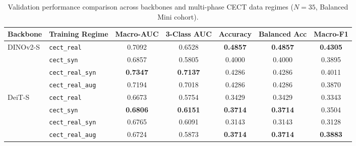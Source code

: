 \begin{table}[t]
\centering
\caption{Validation performance comparison across backbones and multi-phase CECT data regimes ($N=35$, Balanced Mini cohort).}
\label{tab:validation_cect_results_mini}
\begin{tabular}{llccccc}
\toprule
\textbf{Backbone} & \textbf{Training Regime} & \textbf{Macro-AUC} & \textbf{3-Class AUC} & \textbf{Accuracy} & \textbf{Balanced Acc} & \textbf{Macro-F1} \\
\midrule
\multirow{4}{*}{DINOv2-S} & \texttt{cect\_real}       & 0.7092 & 0.6528 & \textbf{0.4857} & \textbf{0.4857} & \textbf{0.4305} \\
                          & \texttt{cect\_syn}        & 0.6857 & 0.5805 & 0.4000 & 0.4000 & 0.3895 \\
                          & \texttt{cect\_real\_syn}  & \textbf{0.7347} & \textbf{0.7137} & 0.4286 & 0.4286 & 0.4011 \\
                          & \texttt{cect\_real\_aug}  & 0.7194 & 0.7018 & 0.4286 & 0.4286 & 0.3870 \\
\midrule
\multirow{4}{*}{DeiT-S}   & \texttt{cect\_real}       & 0.6673 & 0.5754 & 0.3429 & 0.3429 & 0.3343 \\
                          & \texttt{cect\_syn}        & \textbf{0.6806} & \textbf{0.6151} & \textbf{0.3714} & \textbf{0.3714} & 0.3504 \\
                          & \texttt{cect\_real\_syn}  & 0.6765 & 0.6091 & 0.3143 & 0.3143 & 0.3128 \\
                          & \texttt{cect\_real\_aug}  & 0.6724 & 0.5873 & \textbf{0.3714} & \textbf{0.3714} & \textbf{0.3883} \\
\bottomrule
\end{tabular}
\end{table}
